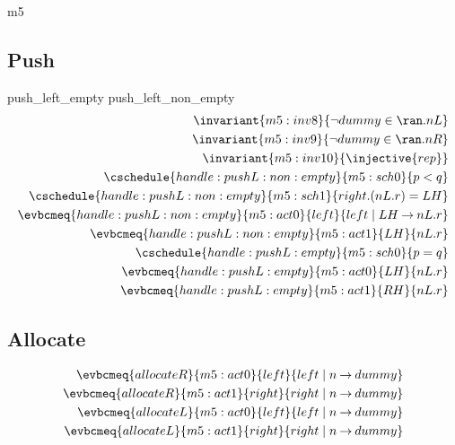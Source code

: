 \documentclass[12pt]{amsart}
\begin{document}
\begin{machine}{m5}
\subsection{Push}
      {push\_left\_empty} 
      {push\_left\_non\_empty}
  \begin{align} 
    \invariant{m5:inv8}{ \neg dummy \in \ran.nL } \\
    \invariant{m5:inv9}{ \neg dummy \in \ran.nR } \\
    \invariant{m5:inv10}{ \injective{rep} } \\
    \cschedule{handle:pushL:non:empty}{m5:sch0}
      { p < q } \\
    \cschedule{handle:pushL:non:empty}{m5:sch1}
      { right.(nL.r) = LH } \\
    \evbcmeq{handle:pushL:non:empty}{m5:act0}
      {left}{left \1| LH \fun nL.r} \\
    \evbcmeq{handle:pushL:non:empty}{m5:act1}
      {LH}{nL.r} \\
    \cschedule{handle:pushL:empty}{m5:sch0}
      { p = q } \\
    \evbcmeq{handle:pushL:empty}{m5:act0}
      {LH}{nL.r} \\
    \evbcmeq{handle:pushL:empty}{m5:act1}
      {RH}{nL.r}
  \end{align}
\subsection{Allocate}
  \begin{align}
    \evbcmeq{allocateR}{m5:act0}{left}{left \1| n \fun dummy} \\
    \evbcmeq{allocateR}{m5:act1}{right}{right \1| n \fun dummy} \\
    \evbcmeq{allocateL}{m5:act0}{left}{left \1| n \fun dummy} \\
    \evbcmeq{allocateL}{m5:act1}{right}{right \1| n \fun dummy} 
  \end{align}
\end{machine}
\end{document}

